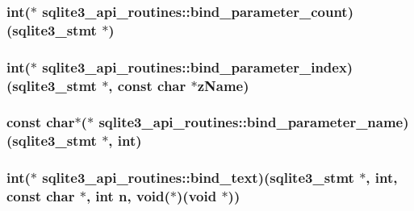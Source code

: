 \hypertarget{structsqlite3__api__routines_ab27285b7fb132f697d5ef22f21469dd6}{
\subsubsection[{bind\-\_\-parameter\-\_\-count}]{\setlength{\rightskip}{0pt plus 5cm}int($\ast$ sqlite3\-\_\-api\-\_\-routines\-::bind\-\_\-parameter\-\_\-count)({\bf sqlite3\-\_\-stmt} $\ast$)}}\label{structsqlite3__api__routines_ab27285b7fb132f697d5ef22f21469dd6}
\hypertarget{structsqlite3__api__routines_a1985681b1e13047a8aae17676debb39d}{
\subsubsection[{bind\-\_\-parameter\-\_\-index}]{\setlength{\rightskip}{0pt plus 5cm}int($\ast$ sqlite3\-\_\-api\-\_\-routines\-::bind\-\_\-parameter\-\_\-index)({\bf sqlite3\-\_\-stmt} $\ast$, const char $\ast$z\-Name)}}\label{structsqlite3__api__routines_a1985681b1e13047a8aae17676debb39d}
\hypertarget{structsqlite3__api__routines_ae313944795333d76400e484b08027b01}{
\subsubsection[{bind\-\_\-parameter\-\_\-name}]{\setlength{\rightskip}{0pt plus 5cm}const char$\ast$($\ast$ sqlite3\-\_\-api\-\_\-routines\-::bind\-\_\-parameter\-\_\-name)({\bf sqlite3\-\_\-stmt} $\ast$, int)}}\label{structsqlite3__api__routines_ae313944795333d76400e484b08027b01}
\hypertarget{structsqlite3__api__routines_a4e64c1e01f7317ce0924683bf26b165a}{
\subsubsection[{bind\-\_\-text}]{\setlength{\rightskip}{0pt plus 5cm}int($\ast$ sqlite3\-\_\-api\-\_\-routines\-::bind\-\_\-text)({\bf sqlite3\-\_\-stmt} $\ast$, int, const char $\ast$, int n, void($\ast$)(void $\ast$))}}\label{structsqlite3__api__routines_a4e64c1e01f7317ce0924683bf26b165a}
